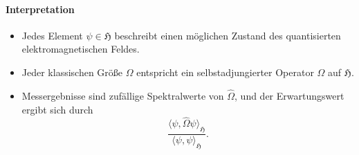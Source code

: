 \documentclass[11pt,a4paper,leqno]{report}
\numberwithin{equation}{chapter}
\begin{document}
\paragraph{Interpretation}
\begin{itemize}
	\item Jedes Element $\psi\in\mathfrak{H}$ beschreibt einen möglichen Zustand des quantisierten elektromagnetischen Feldes. 
	\item Jeder klassischen Größe $\Omega$ entspricht ein selbstadjungierter Operator $\hat{\Omega}$ auf $\mathfrak{H}$. 
	\item Messergebnisse sind zufällige Spektralwerte von $\hat{\Omega}$, und der Erwartungswert ergibt sich durch
	\[
	\frac{\langle \psi, \hat{\Omega}\psi \rangle_{\mathfrak{H}}}{\langle \psi, \psi \rangle_{\mathfrak{H}}}.
	\]
\end{itemize}
\end{document}
